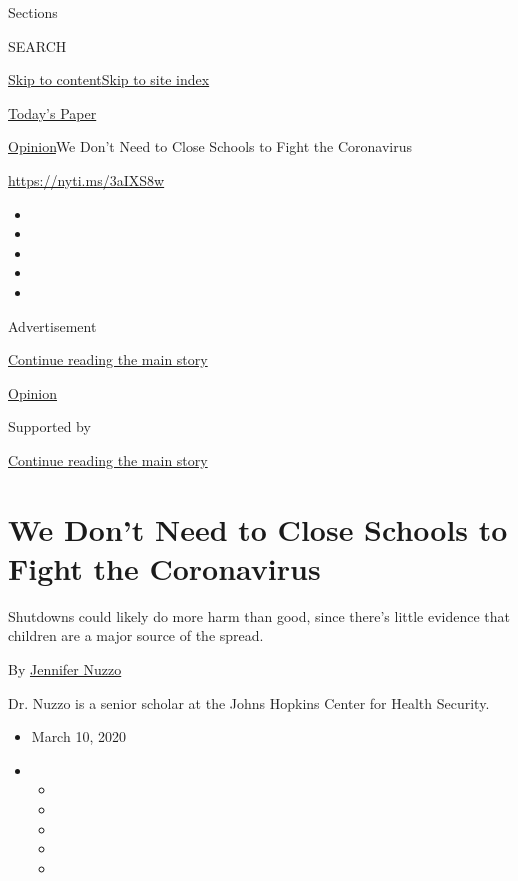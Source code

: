 Sections

SEARCH

\protect\hyperlink{site-content}{Skip to
content}\protect\hyperlink{site-index}{Skip to site index}

\href{https://myaccount.nytimes3xbfgragh.onion/auth/login?response_type=cookie\&client_id=vi}{}

\href{https://www.nytimes3xbfgragh.onion/section/todayspaper}{Today's
Paper}

\href{/section/opinion}{Opinion}\textbar{}We Don't Need to Close Schools
to Fight the Coronavirus

\url{https://nyti.ms/3aIXS8w}

\begin{itemize}
\item
\item
\item
\item
\item
\end{itemize}

Advertisement

\protect\hyperlink{after-top}{Continue reading the main story}

\href{/section/opinion}{Opinion}

Supported by

\protect\hyperlink{after-sponsor}{Continue reading the main story}

\hypertarget{we-dont-need-to-close-schools-to-fight-the-coronavirus}{%
\section{We Don't Need to Close Schools to Fight the
Coronavirus}\label{we-dont-need-to-close-schools-to-fight-the-coronavirus}}

Shutdowns could likely do more harm than good, since there's little
evidence that children are a major source of the spread.

By
\href{http://www.centerforhealthsecurity.org/our-people/nuzzo/}{Jennifer
Nuzzo}

Dr. Nuzzo is a senior scholar at the Johns Hopkins Center for Health
Security.

\begin{itemize}
\item
  March 10, 2020
\item
  \begin{itemize}
  \item
  \item
  \item
  \item
  \item
  \end{itemize}
\end{itemize}


